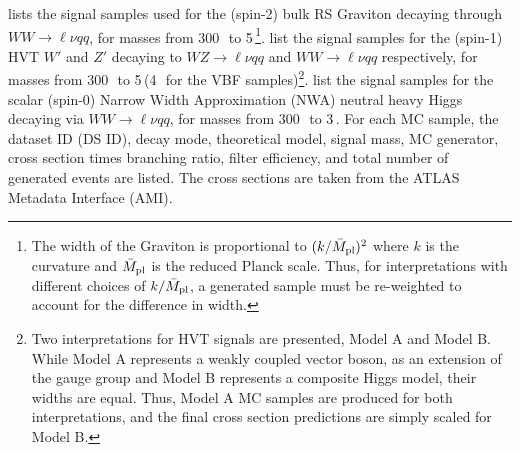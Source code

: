 \Tab{\ref{tabular:mc_samples_graviton}} lists the signal samples used for the (spin-2) bulk RS Graviton decaying through $WW \to \ell\nu qq$, for masses from 300\,\GeV\, to 5\,\TeV\footnote{
	The width of the Graviton is proportional to $(k/\bar{M}_{\rm pl})^2$ where $k$ is the curvature and $\bar{M}_{\rm pl}$ is the reduced Planck scale. Thus, for interpretations with different choices of $k/\bar{M}_{\rm pl}$, a generated sample must be re-weighted to account for the difference in width. 
}.
\Tabrange{\ref{tabular:mc_samples_Zprime}}{\ref{tabular:mc_samples_WprimeVBF}} list the signal samples for the (spin-1) HVT $W'$ and $Z'$ decaying to $WZ\to \ell\nu qq$ and $WW\to \ell\nu qq$ respectively, for masses from 300\,\GeV\, to 5\,\TeV (4\,\TeV\, for the VBF samples)\footnote{
	Two interpretations for HVT signals are presented, Model A and Model B. While Model A represents a weakly coupled vector boson, as an extension of the gauge group and Model B represents a composite Higgs model, their widths are equal. Thus, Model A MC samples are produced for both interpretations, and the final cross section predictions are simply scaled for Model B.
}.
\Tabrange{\ref{tabular:mc_samples_ggFH_NWA}}{\ref{tabular:mc_samples_VBFH_NWA}} list the signal samples for the scalar (spin-0) Narrow Width Approximation (NWA) neutral heavy Higgs decaying via $WW\rightarrow\ell\nu qq$, for masses from 300\,\GeV\, to 3\,\TeV. For each MC sample, the dataset ID (DS ID), decay mode, theoretical model, signal mass, MC generator, cross section times branching ratio, filter efficiency, and total number of generated events are listed. The cross sections are taken from the ATLAS Metadata Interface (AMI)\cite{AMI}.

